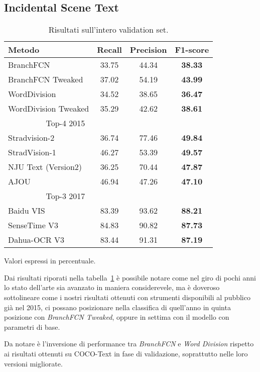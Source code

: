 \subsection{Incidental Scene Text}

\begin{table}[H]
\centering
\begin{threeparttable}
	\begin{tabular}{l *{2}c >{\bf}c }
		\toprule
		
		\textbf{Metodo} & \textbf{Recall} & \textbf{Precision} & \textbf{F1-score} \\

		\midrule

		BranchFCN
		& 33.75 & 44.34 & 38.33 \\
		BranchFCN Tweaked
		& 37.02 & 54.19 & 43.99 \\
		WordDivision
		& 34.52 & 38.65 & 36.47 \\
		WordDivision Tweaked
		& 35.29 & 42.62 & 38.61 \\
		\midrule

		\multicolumn{1}{r}{Top-4 2015~\cite{ICDAR2015results}} \\
		Stradvision-2
		& 36.74 & 77.46 & 49.84 \\
		StradVision-1
		& 46.27 & 53.39 & 49.57 \\
		NJU Text (Version2)	
		& 36.25 & 70.44 & 47.87 \\
		AJOU~\cite{ajou}
		& 46.94 & 47.26 & 47.10 \\
		\midrule

		\multicolumn{1}{r}{Top-3 2017~\cite{ICDAR2015results}} \\
		Baidu VIS
		& 83.39 & 93.62 & 88.21 \\
		SenseTime V3 
		& 84.83 & 90.82 & 87.73 \\
		Dahua-OCR V3
		& 83.44 & 91.31 & 87.19 \\

		\bottomrule
	\end{tabular}
	\begin{tablenotes}
		\item \footnotesize{Valori espressi in percentuale.}
	\end{tablenotes}
\end{threeparttable}
\caption{Risultati sull'intero validation set.}\label{tab:incidental_results}
\end{table}

Dai risultati riporati nella tabella~\ref{tab:incidental_results} è possibile notare come nel giro di pochi anni lo stato dell'arte sia avanzato in maniera considerevele, ma è doveroso sottolineare come i nostri risultati ottenuti con strumenti disponibili al pubblico già nel 2015, ci possano posizionare nella classifica di quell'anno in quinta posizione con \textit{BranchFCN Tweaked}, oppure in settima con il modello con parametri di base.\par
Da notare è l'inversione di performance tra \textit{BranchFCN} e \textit{Word Division} rispetto ai risultati ottenuti su COCO-Text in fase di validazione, soprattutto nelle loro versioni migliorate.

